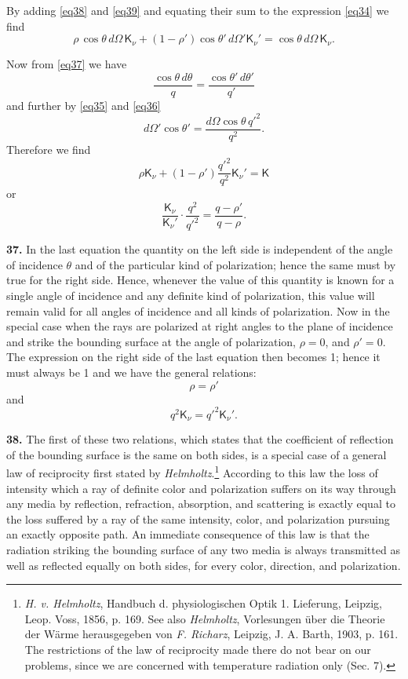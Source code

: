 \documentclass[12pt,oneside]{book}
\begin{document}
By adding \eqref{eq38} and \eqref{eq39} and equating their sum to the expression \eqref{eq34} we find 
\begin{equation*}
    \rho\, \cos\theta\, d\Omega\, \mathsf{K}_\nu + (1-\rho') \cos\theta'\, d\Omega' \mathsf{K}_\nu'=\cos\theta\, d\Omega\, \mathsf{K}_\nu.
\end{equation*} \par 

Now from \eqref{eq37} we have 
$$\frac{\cos\theta\, d\theta}{q}=\frac{\cos\theta'\, d\theta'}{q'}$$
and further by \eqref{eq35} and \eqref{eq36}
$$d\Omega' \cos\theta'=\frac{d\Omega \cos\theta\, q'^2}{q^2}.$$
Therefore we find 
$$\rho\mathsf{K}_\nu +(1-\rho')\frac{q'^2}{q^2}\mathsf{K}_\nu'=\mathsf{K}$$
or 
$$\frac{\mathsf{K}_\nu}{\mathsf{K}_\nu'}\cdot\frac{q^2}{q'^2}=\frac{q-\rho'}{q-\rho}.$$ \par 

\textbf{37.} In the last equation the quantity on the left side is independent of the angle of incidence $\theta$ and of the particular kind of polarization; hence the same must by true for the right side. Hence, whenever the value of this quantity is known for a single angle of incidence and any definite kind of polarization, this value will remain valid for all angles of incidence and all kinds of polarization. Now in the special case when the rays are polarized at right angles to the plane of incidence and strike the bounding surface at the angle of polarization, $\rho=0$, and $\rho'=0$. The expression on the right side of the last equation then becomes 1; hence it must always be 1 and we have the general relations: 
\begin{equation}
    \label{eq40}
    \rho=\rho'
\end{equation}
and 
\begin{equation}
    \label{eq41}
    q^2\mathsf{K}_\nu=q'^2\mathsf{K}_\nu'.
\end{equation} \par 

\textbf{38.} The first of these two relations, which states that the coefficient of reflection of the bounding surface is the same on both sides, is a special case of a general law of reciprocity first stated by \textit{Helmholtz}.\footnote{\textit{H. v. Helmholtz}, Handbuch d. physiologischen Optik 1. Lieferung, Leipzig, Leop. Voss, 1856, p. 169. See also \textit{Helmholtz}, Vorlesungen \"uber die Theorie der W\"arme herausgegeben von \textit{F. Richarz}, Leipzig, J. A. Barth, 1903, p. 161. The restrictions of the law of reciprocity made there do not bear on our problems, since we are concerned with temperature radiation only (Sec. 7).} According to this law the loss of intensity which a ray of definite color and polarization suffers on its way through any media by reflection, refraction, absorption, and scattering is exactly equal to the loss suffered by a ray of the same intensity, color, and polarization pursuing an exactly opposite path. An immediate consequence of this law is that the radiation striking the bounding surface of any two media is always transmitted as well as reflected equally on both sides, for every color, direction, and polarization. \par 
\end{document}

